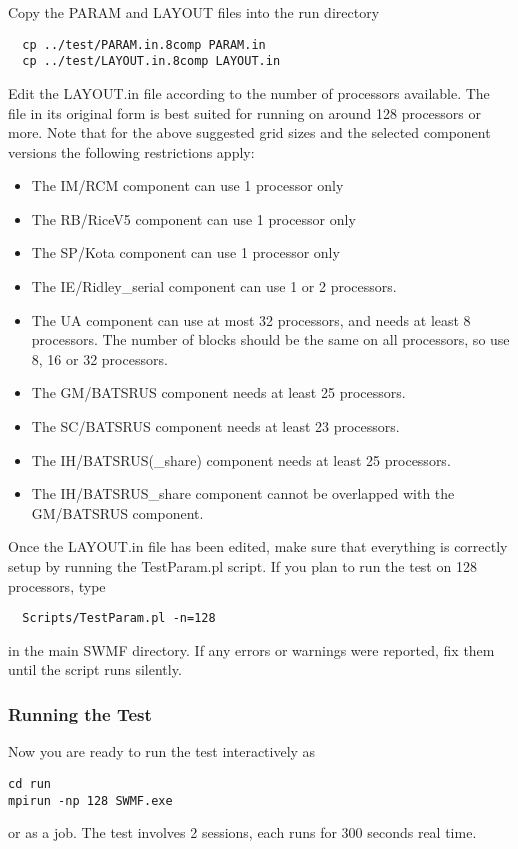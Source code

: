 Copy the PARAM and LAYOUT files into the run directory
\begin{verbatim}
  cp ../test/PARAM.in.8comp PARAM.in
  cp ../test/LAYOUT.in.8comp LAYOUT.in
\end{verbatim}
Edit the LAYOUT.in file according to the number of processors
available. The file in its original form is best suited for 
running on around 128 processors or more.
Note that for the above suggested grid sizes and the
selected component versions the following restrictions apply:
\begin{itemize}
\item The IM/RCM component can use 1 processor only
\item The RB/RiceV5 component can use 1 processor only
\item The SP/Kota component can use 1 processor only
\item The IE/Ridley\_serial component can use 1 or 2 processors.
\item The UA component can use at most 32 processors, 
      and needs at least 8 processors. The number of blocks should
      be the same on all processors, so use 8, 16 or 32 processors.
\item The GM/BATSRUS component needs at least 25 processors.
\item The SC/BATSRUS component needs at least 23 processors.
\item The IH/BATSRUS(\_share) component needs at least 25 processors.
\item The IH/BATSRUS\_share component cannot be overlapped with the
      GM/BATSRUS component.
\end{itemize}
Once the LAYOUT.in file has been edited, make sure that everything
is correctly setup by running the TestParam.pl script. 
If you plan to run the test on 128 processors, type
\begin{verbatim}
  Scripts/TestParam.pl -n=128
\end{verbatim}
in the main SWMF directory.
If any errors or warnings were reported, fix them until the script
runs silently. 

\subsubsection{Running the Test}

Now you are ready to run the test interactively as
\begin{verbatim}
cd run
mpirun -np 128 SWMF.exe
\end{verbatim}
or as a job. The test involves 2 sessions, each runs for 300 seconds
real time. 

